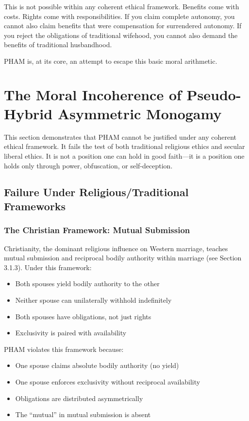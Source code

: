 \documentclass[12pt,openany]{book}
\numberwithin{equation}{chapter}
\begin{document}
This is not possible within any coherent ethical framework. Benefits come with costs. Rights come with responsibilities. If you claim complete autonomy, you cannot also claim benefits that were compensation for surrendered autonomy. If you reject the obligations of traditional wifehood, you cannot also demand the benefits of traditional husbandhood.

PHAM is, at its core, an attempt to escape this basic moral arithmetic.

\chapter{The Moral Incoherence of Pseudo-Hybrid Asymmetric Monogamy}

This section demonstrates that PHAM cannot be justified under any coherent ethical framework. It fails the test of both traditional religious ethics and secular liberal ethics. It is not a position one can hold in good faith---it is a position one holds only through power, obfuscation, or self-deception.

\section{Failure Under Religious/Traditional Frameworks}

\subsection{The Christian Framework: Mutual Submission}

Christianity, the dominant religious influence on Western marriage, teaches mutual submission and reciprocal bodily authority within marriage (see Section 3.1.3). Under this framework:

\begin{itemize}
    \item Both spouses yield bodily authority to the other
    \item Neither spouse can unilaterally withhold indefinitely
    \item Both spouses have obligations, not just rights
    \item Exclusivity is paired with availability
\end{itemize}

PHAM violates this framework because:
\begin{itemize}
    \item One spouse claims absolute bodily authority (no yield)
    \item One spouse enforces exclusivity without reciprocal availability
    \item Obligations are distributed asymmetrically
    \item The ``mutual'' in mutual submission is absent
\end{itemize}
\end{document}
